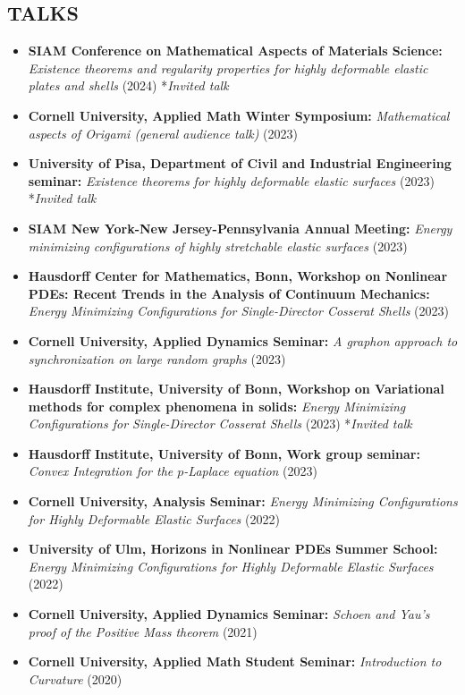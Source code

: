 \documentclass[margin]{res} %
\begin{document}
\begin{resume}
\section{TALKS}
\begin{itemize}
	\item \textbf{SIAM Conference on Mathematical Aspects of Materials Science:} \textit{Existence theorems and regularity properties for highly deformable elastic plates and shells} (2024) *\textit{Invited talk}
	\item \textbf{Cornell University, Applied Math Winter Symposium:} \textit{Mathematical aspects of Origami (general audience talk)} (2023)
	\item \textbf{University of Pisa, Department of Civil and Industrial Engineering seminar:} \textit{Existence theorems for highly deformable elastic surfaces} (2023) *\textit{Invited talk}
	\item \textbf{SIAM New York-New Jersey-Pennsylvania Annual Meeting:} \textit{Energy minimizing configurations of highly stretchable elastic surfaces} (2023)
	\item \textbf{Hausdorff Center for Mathematics, Bonn, Workshop on Nonlinear PDEs: Recent Trends in the Analysis of Continuum Mechanics:} \textit{Energy Minimizing Configurations for Single-Director Cosserat Shells} (2023) 
	\item \textbf{Cornell University, Applied Dynamics Seminar:} \textit{A graphon approach to synchronization on large random graphs} (2023)
	\item \textbf{Hausdorff Institute, University of Bonn, Workshop on Variational methods for complex phenomena in solids:} \textit{Energy Minimizing Configurations for Single-Director Cosserat Shells} (2023) *\textit{Invited talk}
	\item \textbf{Hausdorff Institute, University of Bonn, Work group seminar:} \textit{Convex Integration for the $p$-Laplace equation} (2023)
	\item \textbf{Cornell University, Analysis Seminar:} \textit{Energy Minimizing Configurations for Highly Deformable Elastic Surfaces} (2022)
	\item \textbf{University of Ulm, Horizons in Nonlinear PDEs Summer School:} \textit{Energy Minimizing Configurations for Highly Deformable Elastic Surfaces} (2022)
	\item \textbf{Cornell University, Applied Dynamics Seminar:} \textit{Schoen and Yau's proof of the Positive Mass theorem} (2021)
	\item \textbf{Cornell University, Applied Math Student Seminar:} \textit{Introduction to Curvature} (2020)

\end{itemize}
\end{resume}
\end{document}

